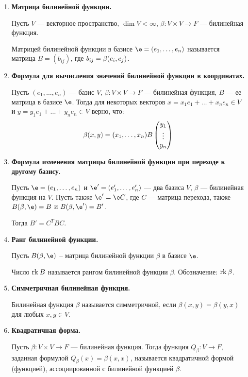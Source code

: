 \begin{enumerate}
\item \textbf{Матрица билинейной функции.}

Пусть $V$ --- векторное пространство, $\dim V < \infty$, $\beta \colon V \times V \rightarrow F$ --- билинейная функция.

Матрицей билинейной функции в базисе $\e = (e_1, \ldots, e_n)$ называется матрица $B = (b_{ij})$, где $b_{ij} \hm= \beta(e_i, e_j)$.

\item \textbf{Формула для вычисления значений билинейной функции в координатах.}

Пусть $(e_1, \ldots, e_n)$ --- базис $V$, $\beta \colon V \times V \to F$ --- билинейная функция, $B$ --- ее матрица в базисе $\e $. Тогда для некоторых векторов $x = x_1e_1 + \ldots + x_ne_n \in V$ и $y = y_1e_1 + \ldots + y_ne_n \in V$ верно, что:
\begin{gather*}
\beta(x, y) = (x_1, \ldots, x_n)B \begin{pmatrix}{y}_1 \\\vdots\\{y}_n\end{pmatrix}
\end{gather*}

\item \textbf{Формула изменения матрицы билинейной функции при переходе к другому базису.} 

Пусть $\e = (e_1, \ldots, e_n)$ и $\e' = (e'_1, \ldots, e'_n)$ --- два базиса $V$, $\beta$ --- билинейная функция на $V$. Пусть также $\e' = \e C$, где $C$ --- матрица перехода, также $B(\beta, \e) = B$ и $B(\beta, \e') = B'$.

Тогда $B' = C^TBC$.

\item \textbf{Ранг билинейной функции.}

Пусть $B(\beta, \e)$ -- матрица билинейной функции $\beta$ в базисе $\e$.

Число $\mathrm{rk}\: B$ называется рангом билинейной функции $\beta$. Обозначение: $\mathrm{rk}\: \beta$.

\item \textbf{Симметричная билинейная функция.}

Билинейная функция $\beta$ называется симметричной, если $\beta(x, y) =\beta(y, x)$ для любых $x, y \in V$.

\item \textbf{Квадратичная форма.}

Пусть $\beta \colon V\times V \rightarrow F$ --- билинейная функция. Тогда функция $Q_\beta \colon V \rightarrow F$, заданная формулой $Q_\beta(x) = \beta(x, x)$, называется квадратичной формой (функцией), ассоциированной с билинейной функцией $\beta$.


\end{enumerate}
